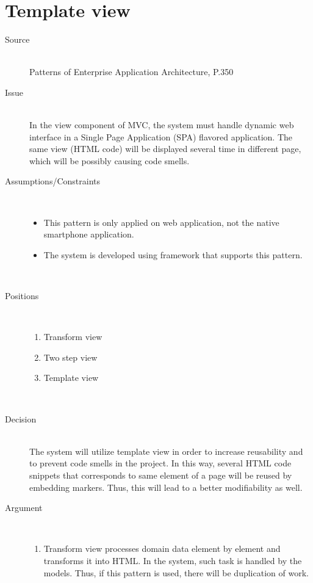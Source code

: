 \section{Template view}
\begin{description}
\item [Source]~\\
Patterns of Enterprise Application Architecture, P.350 \cite{Fowler:2002:PEA:579257}

\item [Issue]~\\
In the view component of MVC, the system must handle dynamic web interface in a Single Page Application (SPA) flavored application. The same view (HTML code) will be displayed several time in different page, which will be possibly causing code smells.

\item [Assumptions/Constraints]~
\begin{itemize}
\item This pattern is only applied on web application, not the native smartphone application.
\item The system is developed using framework that supports this pattern.
\end{itemize}
~\\[-1.5cm]

\item [Positions]~
\begin{enumerate}
\item Transform view
\item Two step view
\item Template view
\end{enumerate}
~\\[-1.5cm]

\item [Decision] ~\\
The system will utilize template view in order to increase reusability and to prevent code smells in the project. In this way, several HTML code snippets that corresponds to same element of a page will be reused by embedding markers. Thus, this will lead to a better modifiability as well.

\item [Argument]~
\begin{enumerate}
\item Transform view processes domain data element by element and transforms it into HTML. In the system, such task is handled by the models. Thus, if this pattern is used, there will be duplication of work.


\end{enumerate}
\end{description}
